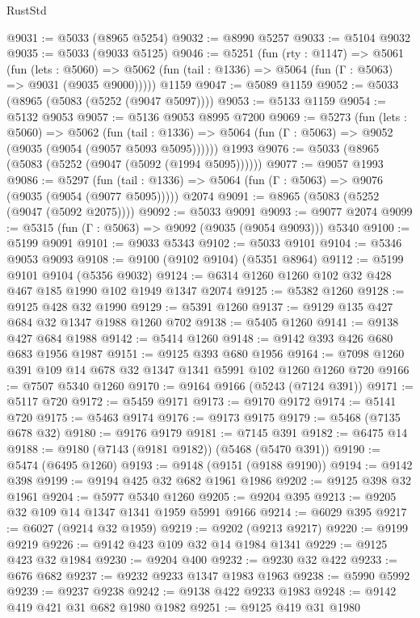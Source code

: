 \begin{lexlean}{RustStd}
\begin{coremodule}
@9031 := @5033 (@8965 @5254)
@9032 := @8990 @5257
@9033 := @5104 @9032
@9035 := @5033 (@9033 @5125)
@9046 := @5251
    (fun (rty : @1147) =>
    @5061
      (fun (lets : @5060) =>
      @5062 (fun (tail : @1336) => @5064 (fun (Γ : @5063) => @9031 (@9035 @9000)))))
    @1159
@9047 := @5089 @1159
@9052 := @5033 (@8965 (@5083 (@5252 (@9047 @5097))))
@9053 := @5133 @1159
@9054 := @5132 @9053
@9057 := @5136 @9053 @8995 @7200
@9069 := @5273
    (fun (lets : @5060) =>
    @5062
      (fun (tail : @1336) => @5064 (fun (Γ : @5063) => @9052 (@9035 (@9054 (@9057 @5093 @5095))))))
    @1993
@9076 := @5033 (@8965 (@5083 (@5252 (@9047 (@5092 (@1994 @5095))))))
@9077 := @9057 @1993
@9086 := @5297
    (fun (tail : @1336) => @5064 (fun (Γ : @5063) => @9076 (@9035 (@9054 (@9077 @5095)))))
    @2074
@9091 := @8965 (@5083 (@5252 (@9047 (@5092 @2075))))
@9092 := @5033 @9091
@9093 := @9077 @2074
@9099 := @5315 (fun (Γ : @5063) => @9092 (@9035 (@9054 @9093))) @5340
@9100 := @5199 @9091
@9101 := @9033 @5343
@9102 := @5033 @9101
@9104 := @5346 @9053 @9093
@9108 := @9100 (@9102 @9104) (@5351 @8964)
@9112 := @5199 @9101 @9104 (@5356 @9032)
@9124 := @6314 @1260 @1260 @102 @32 @428 @467 @185 @1990 @102 @1949 @1347 @2074
@9125 := @5382 @1260
@9128 := @9125 @428 @32 @1990
@9129 := @5391 @1260
@9137 := @9129 @135 @427 @684 @32 @1347 @1988 @1260 @702
@9138 := @5405 @1260
@9141 := @9138 @427 @684 @1988
@9142 := @5414 @1260
@9148 := @9142 @393 @426 @680 @683 @1956 @1987
@9151 := @9125 @393 @680 @1956
@9164 := @7098 @1260 @391 @109 @14 @678 @32 @1347 @1341 @5991 @102 @1260 @1260 @720
@9166 := @7507 @5340 @1260
@9170 := @9164 @9166 (@5243 (@7124 @391))
@9171 := @5117 @720
@9172 := @5459 @9171
@9173 := @9170 @9172
@9174 := @5141 @720
@9175 := @5463 @9174
@9176 := @9173 @9175
@9179 := @5468 (@7135 @678 @32)
@9180 := @9176 @9179
@9181 := @7145 @391
@9182 := @6475 @14
@9188 := @9180 (@7143 (@9181 @9182)) (@5468 (@5470 @391))
@9190 := @5474 (@6495 @1260)
@9193 := @9148 (@9151 (@9188 @9190))
@9194 := @9142 @398
@9199 := @9194 @425 @32 @682 @1961 @1986
@9202 := @9125 @398 @32 @1961
@9204 := @5977 @5340 @1260
@9205 := @9204 @395
@9213 := @9205 @32 @109 @14 @1347 @1341 @1959 @5991 @9166
@9214 := @6029 @395
@9217 := @6027 (@9214 @32 @1959)
@9219 := @9202 (@9213 @9217)
@9220 := @9199 @9219
@9226 := @9142 @423 @109 @32 @14 @1984 @1341
@9229 := @9125 @423 @32 @1984
@9230 := @9204 @400
@9232 := @9230 @32 @422
@9233 := @676 @682
@9237 := @9232 @9233 @1347 @1983 @1963
@9238 := @5990 @5992
@9239 := @9237 @9238
@9242 := @9138 @422 @9233 @1983
@9248 := @9142 @419 @421 @31 @682 @1980 @1982
@9251 := @9125 @419 @31 @1980

\end{coremodule}
\end{lexlean}
